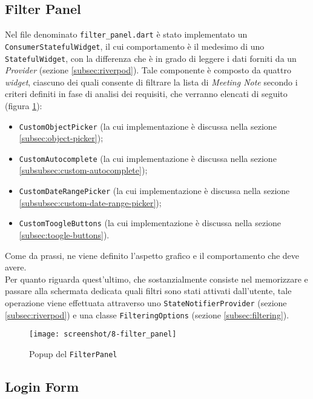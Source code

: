 \subsection{Filter Panel}
\label{subsec:filter-panel}

Nel file denominato \lstinline{filter_panel.dart} è stato implementato un \lstinline{ConsumerStatefulWidget}\cite{site:reading-provider}, il cui comportamento è il medesimo di uno \lstinline{StatefulWidget}, con la differenza che è in grado di leggere i dati forniti da un \emph{Provider} (sezione \ref{subsec:riverpod}).
Tale componente è composto da quattro \emph{widget}, ciascuno dei quali consente di filtrare la lista di \emph{Meeting Note}  secondo i criteri definiti in fase di analisi dei requisiti, che verranno elencati di seguito (figura \ref{fig:filter-panel}):
\begin{itemize}
    \item \lstinline{CustomObjectPicker} (la cui implementazione è discussa nella sezione \ref{subsec:object-picker});
    \item \lstinline{CustomAutocomplete} (la cui implementazione è discussa nella sezione \ref{subsubsec:custom-autocomplete});
    \item \lstinline{CustomDateRangePicker} (la cui implementazione è discussa nella sezione \ref{subsubsec:custom-date-range-picker});
    \item \lstinline{CustomToogleButtons} (la cui implementazione è discussa nella sezione \ref{subsec:toogle-buttons}).
\end{itemize}
Come da prassi, ne viene definito l'aspetto grafico e il comportamento che deve avere.\\
Per quanto riguarda quest'ultimo, che sostanzialmente consiste nel memorizzare e passare alla schermata dedicata quali filtri sono stati attivati dall'utente, tale operazione viene effettuata attraverso uno \lstinline{StateNotifierProvider} (sezione \ref{subsec:riverpod}) e una classe \lstinline{FilteringOptions} (sezione \ref{subsec:filtering}).

\begin{figure}[!h] 
    \centering 
    \texttt{[image: screenshot/8-filter\_panel]} 
    \caption{Popup del \lstinline{FilterPanel}}
    \label{fig:filter-panel}
\end{figure}

\subsection{Login Form}
\label{subsec:login-form}

